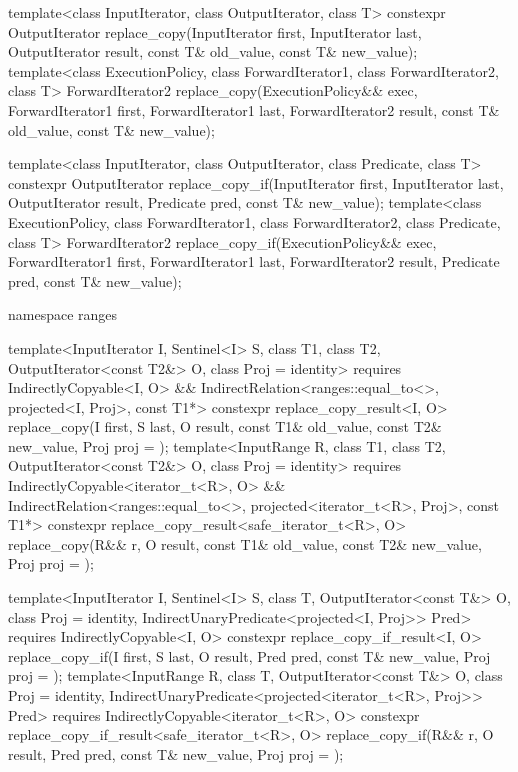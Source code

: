 %
%
\begin{itemdecl}
template<class InputIterator, class OutputIterator, class T>
  constexpr OutputIterator
    replace_copy(InputIterator first, InputIterator last,
                 OutputIterator result,
                 const T& old_value, const T& new_value);
template<class ExecutionPolicy, class ForwardIterator1, class ForwardIterator2, class T>
  ForwardIterator2
    replace_copy(ExecutionPolicy&& exec,
                 ForwardIterator1 first, ForwardIterator1 last,
                 ForwardIterator2 result,
                 const T& old_value, const T& new_value);

template<class InputIterator, class OutputIterator, class Predicate, class T>
  constexpr OutputIterator
    replace_copy_if(InputIterator first, InputIterator last,
                    OutputIterator result,
                    Predicate pred, const T& new_value);
template<class ExecutionPolicy, class ForwardIterator1, class ForwardIterator2,
         class Predicate, class T>
  ForwardIterator2
    replace_copy_if(ExecutionPolicy&& exec,
                    ForwardIterator1 first, ForwardIterator1 last,
                    ForwardIterator2 result,
                    Predicate pred, const T& new_value);

namespace ranges {
  template<InputIterator I, Sentinel<I> S, class T1, class T2, OutputIterator<const T2&> O,
           class Proj = identity>
    requires IndirectlyCopyable<I, O> &&
             IndirectRelation<ranges::equal_to<>, projected<I, Proj>, const T1*>
    constexpr replace_copy_result<I, O>
      replace_copy(I first, S last, O result, const T1& old_value, const T2& new_value,
                   Proj proj = {});
  template<InputRange R, class T1, class T2, OutputIterator<const T2&> O,
           class Proj = identity>
    requires IndirectlyCopyable<iterator_t<R>, O> &&
             IndirectRelation<ranges::equal_to<>, projected<iterator_t<R>, Proj>, const T1*>
    constexpr replace_copy_result<safe_iterator_t<R>, O>
      replace_copy(R&& r, O result, const T1& old_value, const T2& new_value,
                   Proj proj = {});

  template<InputIterator I, Sentinel<I> S, class T, OutputIterator<const T&> O,
           class Proj = identity, IndirectUnaryPredicate<projected<I, Proj>> Pred>
    requires IndirectlyCopyable<I, O>
    constexpr replace_copy_if_result<I, O>
      replace_copy_if(I first, S last, O result, Pred pred, const T& new_value,
                      Proj proj = {});
  template<InputRange R, class T, OutputIterator<const T&> O, class Proj = identity,
           IndirectUnaryPredicate<projected<iterator_t<R>, Proj>> Pred>
    requires IndirectlyCopyable<iterator_t<R>, O>
    constexpr replace_copy_if_result<safe_iterator_t<R>, O>
      replace_copy_if(R&& r, O result, Pred pred, const T& new_value,
                      Proj proj = {});
}
\end{itemdecl}

